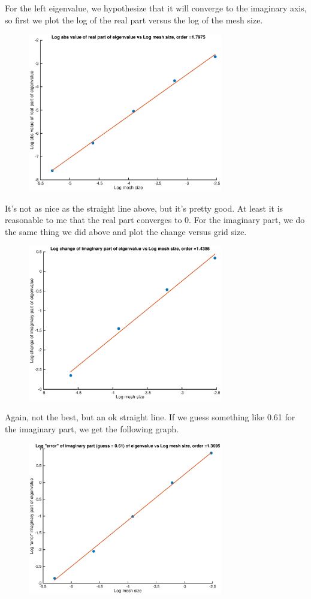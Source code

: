\documentclass[12pt]{article}
\begin{document}
For the left eigenvalue, we hypothesize that it will converge to the imaginary axis, so first we plot the log of the real part versus the log of the mesh size.
\begin{figure}[H]
\includegraphics[width=8.5cm]{double2logplotleftreal.eps}
\end{figure}
It's not as nice as the straight line above, but it's pretty good. At least it is reasonable to me that the real part converges to 0. For the imaginary part, we do the same thing we did above and plot the change versus grid size.
\begin{figure}[H]
\includegraphics[width=8.5cm]{double2logplotleftimag.eps}
\end{figure}
Again, not the best, but an ok straight line. If we guess something like 0.61 for the imaginary part, we get the following graph.
\begin{figure}[H]
\includegraphics[width=8.5cm]{double2logplotleftimag2.eps}
\end{figure}
\end{document}
